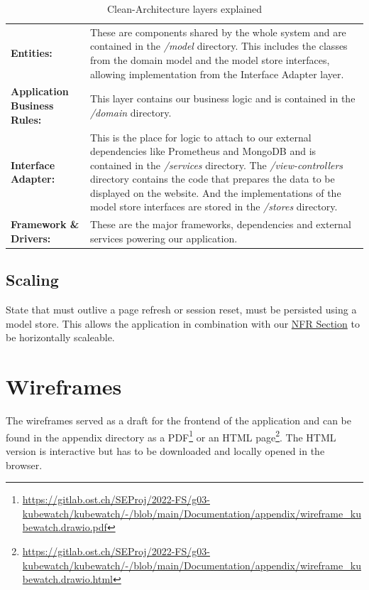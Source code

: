 \begin{table}[H]
  \begin{tabular*}{\textwidth}{p{3cm} | p{11cm}}
    \textbf{Entities:} &
      These are components shared by the whole system and are contained
      in the \textit{/model} directory.
      This includes the classes from the domain model and the model store interfaces,
      allowing implementation from the Interface Adapter layer. \bigskip \\
    \textbf{Application Business Rules:} &
      This layer contains our business logic and is contained in
      the \textit{/domain} directory. \bigskip \\
    \textbf{Interface Adapter:} &
      This is the place for logic to attach to our external dependencies
      like Prometheus and MongoDB and is contained in the \textit{/services} directory.
      The \textit{/view-controllers} directory contains the code
      that prepares the data to be displayed on the website.
      And the implementations of the model store interfaces are stored
      in the \textit{/stores} directory. \bigskip \\
    \textbf{Framework \& Drivers:} &
      These are the major frameworks, dependencies and external services powering our application. \\
  \end{tabular*}
  \caption{Clean-Architecture layers explained}
  \label{tab:clean-architecture-layers-explained}
\end{table}

\subsection{Scaling}
State that must outlive a page refresh or session reset, must be persisted using a model store.
This allows the application in combination with our \hyperref[section:non-functional-requirements]{NFR Section} to be horizontally scaleable.

\section{Wireframes}
The wireframes served as a draft for the frontend of the application and can be found in the appendix directory as a
PDF\footnote{\url{https://gitlab.ost.ch/SEProj/2022-FS/g03-kubewatch/kubewatch/-/blob/main/Documentation/appendix/wireframe_kubewatch.drawio.pdf}}
or an HTML page\footnote{\url{https://gitlab.ost.ch/SEProj/2022-FS/g03-kubewatch/kubewatch/-/blob/main/Documentation/appendix/wireframe_kubewatch.drawio.html}}.
The HTML version is interactive but has to be downloaded and locally opened in the browser.

